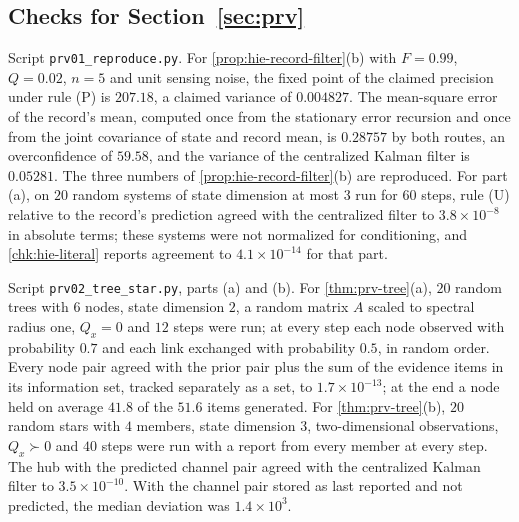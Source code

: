 \subsection{Checks for \texorpdfstring{Section~\ref{sec:prv}}{evidence provenance}}\label{chk:prv}

\begin{numcheck}\label{chk:prv-reproduce}
Script \texttt{prv01\_reproduce.py}. For \cref{prop:hie-record-filter}(b) with $F=0.99$, $Q=0.02$, $n=5$ and unit sensing noise, the fixed point of the claimed precision under rule (P) is $207.18$, a claimed variance of $0.004827$. The mean-square error of the record's mean, computed once from the stationary error recursion and once from the joint covariance of state and record mean, is $0.28757$ by both routes, an overconfidence of $59.58$, and the variance of the centralized Kalman filter is $0.05281$. The three numbers of \cref{prop:hie-record-filter}(b) are reproduced. For part (a), on $20$ random systems of state dimension at most $3$ run for $60$ steps, rule (U) relative to the record's prediction agreed with the centralized filter to $3.8\times10^{-8}$ in absolute terms; these systems were not normalized for conditioning, and \cref{chk:hie-literal} reports agreement to $4.1\times10^{-14}$ for that part.
\end{numcheck}

\begin{numcheck}\label{chk:prv-tree}
Script \texttt{prv02\_tree\_star.py}, parts (a) and (b). For \cref{thm:prv-tree}(a), $20$ random trees with $6$ nodes, state dimension $2$, a random matrix $A$ scaled to spectral radius one, $Q_x=0$ and $12$ steps were run; at every step each node observed with probability $0.7$ and each link exchanged with probability $0.5$, in random order. Every node pair agreed with the prior pair plus the sum of the evidence items in its information set, tracked separately as a set, to $1.7\times10^{-13}$; at the end a node held on average $41.8$ of the $51.6$ items generated. For \cref{thm:prv-tree}(b), $20$ random stars with $4$ members, state dimension $3$, two-dimensional observations, $Q_x\succ0$ and $40$ steps were run with a report from every member at every step. The hub with the predicted channel pair agreed with the centralized Kalman filter to $3.5\times10^{-10}$. With the channel pair stored as last reported and not predicted, the median deviation was $1.4\times10^{3}$.
\end{numcheck}

